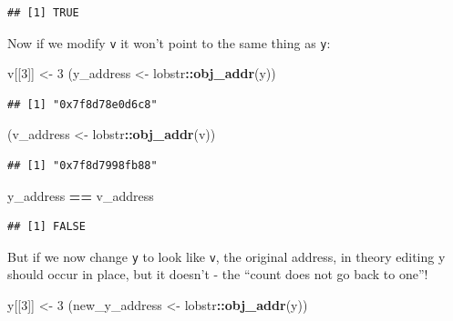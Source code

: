 \documentclass[]{book}
\newenvironment{Shaded}{\begin{snugshade}}{\end{snugshade}}
\newcommand{\DecValTok}[1]{\textcolor[rgb]{0.00,0.00,0.81}{#1}}
\newcommand{\KeywordTok}[1]{\textcolor[rgb]{0.13,0.29,0.53}{\textbf{#1}}}
\newcommand{\NormalTok}[1]{#1}
\newcommand{\OperatorTok}[1]{\textcolor[rgb]{0.81,0.36,0.00}{\textbf{#1}}}
\newcommand{\StringTok}[1]{\textcolor[rgb]{0.31,0.60,0.02}{#1}}
\begin{document}
\begin{verbatim}
## [1] TRUE
\end{verbatim}

Now if we modify \texttt{v} it won't point to the same thing as \texttt{y}:

\begin{Shaded}
\begin{Highlighting}[]
\NormalTok{v[[}\DecValTok{3}\NormalTok{]] <-}\StringTok{ }\DecValTok{3}
\NormalTok{(y_address <-}\StringTok{ }\NormalTok{lobstr}\OperatorTok{::}\KeywordTok{obj_addr}\NormalTok{(y))}
\end{Highlighting}
\end{Shaded}

\begin{verbatim}
## [1] "0x7f8d78e0d6c8"
\end{verbatim}

\begin{Shaded}
\begin{Highlighting}[]
\NormalTok{(v_address <-}\StringTok{ }\NormalTok{lobstr}\OperatorTok{::}\KeywordTok{obj_addr}\NormalTok{(v))}
\end{Highlighting}
\end{Shaded}

\begin{verbatim}
## [1] "0x7f8d7998fb88"
\end{verbatim}

\begin{Shaded}
\begin{Highlighting}[]
\NormalTok{y_address }\OperatorTok{==}\StringTok{ }\NormalTok{v_address}
\end{Highlighting}
\end{Shaded}

\begin{verbatim}
## [1] FALSE
\end{verbatim}

But if we now change \texttt{y} to look like \texttt{v}, the original address, in theory editing y should occur in place, but it doesn't - the ``count does not go back to one''!

\begin{Shaded}
\begin{Highlighting}[]
\NormalTok{y[[}\DecValTok{3}\NormalTok{]] <-}\StringTok{ }\DecValTok{3}
\NormalTok{(new_y_address <-}\StringTok{ }\NormalTok{lobstr}\OperatorTok{::}\KeywordTok{obj_addr}\NormalTok{(y))}
\end{Highlighting}
\end{Shaded}
\end{document}
